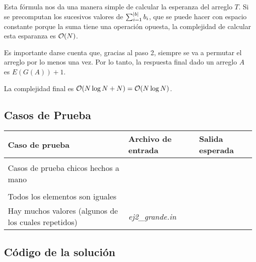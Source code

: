 Esta fórmula nos da una manera simple de calcular la esperanza del arreglo \(T\). Si se precomputan los sucesivos valores de \(\sum\nolimits^{\left|b\right|}_{i = 1}{b_i}\), que se puede hacer con espacio constante porque la suma tiene una operación opuesta, la complejidad de calcular esta esparanza es \(\mathcal{O}(N)\).

Es importante darse cuenta que, gracias al paso 2, siempre se va a permutar el arreglo por lo menos una vez. Por lo tanto, la respuesta final dado un arreglo \(A\) es \(E\left(G\left(A\right)\right) + 1\).

La complejidad final es \(\mathcal{O}(N \log N + N) = \mathcal{O}(N \log N)\).

\subsection{Casos de Prueba}

\begin{tabulary}{\textwidth}{L l l}
\toprule
\textbf{Caso de prueba} & \textbf{Archivo de entrada} & \textbf{Salida esperada} \\
\midrule
&  &  \\
Casos de prueba chicos hechos a mano &  &  \\
&  &  \\
\midrule
Todos los elementos son iguales &  &  \\
\midrule
Hay muchos valores (algunos de los cuales repetidos) & \textit{ej2\_grande.in} &  \\
\bottomrule
\end{tabulary}

\newpage
\subsection{Código de la solución}
\lstset{inputencoding=utf8/latin1}

